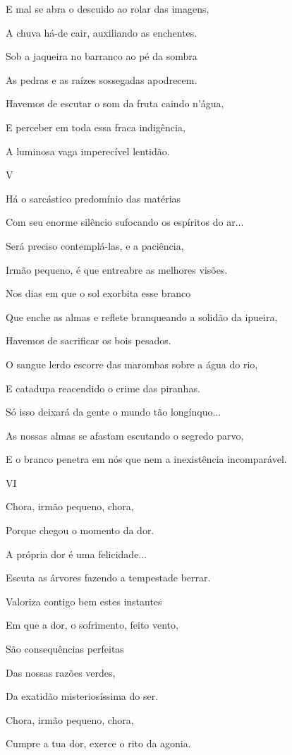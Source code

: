 E mal se abra o descuido ao rolar das imagens,

A chuva há-de cair, auxiliando as enchentes.

Sob a jaqueira no barranco ao pé da sombra

As pedras e as raízes sossegadas apodrecem.

Havemos de escutar o som da fruta caindo n'água,

E perceber em toda essa fraca indigência,

A luminosa vaga imperecível lentidão.

V

Há o sarcástico predomínio das matérias

Com seu enorme silêncio sufocando os espíritos do ar...

Será preciso contemplá-las, e a paciência,

Irmão pequeno, é que entreabre as melhores visões.

Nos dias em que o sol exorbita esse branco

Que enche as almas e reflete branqueando a solidão da ipueira,

Havemos de sacrificar os bois pesados.

O sangue lerdo escorre das marombas sobre a água do rio,

E catadupa reacendido o crime das piranhas.

Só isso deixará da gente o mundo tão longínquo...

As nossas almas se afastam escutando o segredo parvo,

E o branco penetra em nós que nem a inexistência incomparável.

VI

Chora, irmão pequeno, chora,

Porque chegou o momento da dor.

A própria dor é uma felicidade...

Escuta as árvores fazendo a tempestade berrar.

Valoriza contigo bem estes instantes

Em que a dor, o sofrimento, feito vento,

São consequências perfeitas

Das nossas razões verdes,

Da exatidão misteriosíssima do ser.

Chora, irmão pequeno, chora,

Cumpre a tua dor, exerce o rito da agonia.

